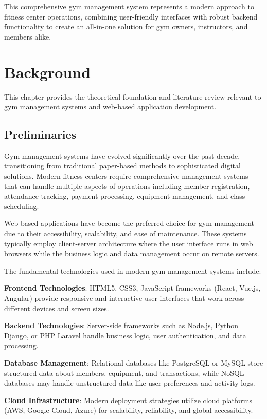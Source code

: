 \documentclass[12pt,a4paper]{report}
\begin{document}
This comprehensive gym management system represents a modern approach to fitness center operations, combining user-friendly interfaces with robust backend functionality to create an all-in-one solution for gym owners, instructors, and members alike.

\chapter{Background}
\label{ch:background}

This chapter provides the theoretical foundation and literature review relevant to gym management systems and web-based application development.

\section{Preliminaries}
\label{sec:preliminaries}

Gym management systems have evolved significantly over the past decade, transitioning from traditional paper-based methods to sophisticated digital solutions. Modern fitness centers require comprehensive management systems that can handle multiple aspects of operations including member registration, attendance tracking, payment processing, equipment management, and class scheduling.

Web-based applications have become the preferred choice for gym management due to their accessibility, scalability, and ease of maintenance. These systems typically employ client-server architecture where the user interface runs in web browsers while the business logic and data management occur on remote servers.

The fundamental technologies used in modern gym management systems include:

\textbf{Frontend Technologies}: HTML5, CSS3, JavaScript frameworks (React, Vue.js, Angular) provide responsive and interactive user interfaces that work across different devices and screen sizes.

\textbf{Backend Technologies}: Server-side frameworks such as Node.js, Python Django, or PHP Laravel handle business logic, user authentication, and data processing.

\textbf{Database Management}: Relational databases like PostgreSQL or MySQL store structured data about members, equipment, and transactions, while NoSQL databases may handle unstructured data like user preferences and activity logs.

\textbf{Cloud Infrastructure}: Modern deployment strategies utilize cloud platforms (AWS, Google Cloud, Azure) for scalability, reliability, and global accessibility.
\end{document}
